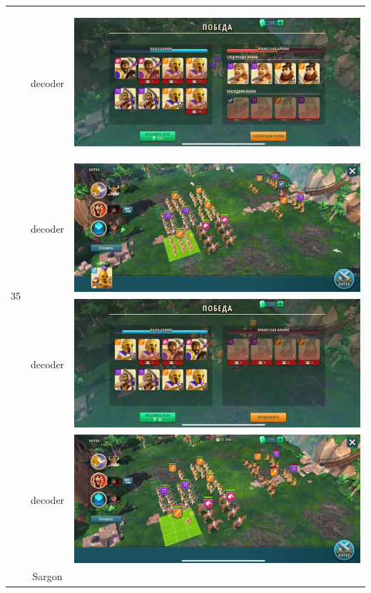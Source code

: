 \begin{longtable}{|c|c|c|}
    \hline
    \multirow{8}{*}{35} & decoder &
    \hypertarget{fight35}{\includegraphics[width=0.75\linewidth]{./parts/media/TreasureHunt/35/decoder/photo_2022-04-07_10-06-08.jpg}} \\
    & decoder &
    \includegraphics[width=0.75\linewidth]{./parts/media/TreasureHunt/35/decoder/photo_2022-04-07_10-05-55.jpg} \\
    & decoder &
    \includegraphics[width=0.75\linewidth]{./parts/media/TreasureHunt/35/decoder/photo_2022-04-07_10-06-14.jpg} \\
    & decoder &
    \includegraphics[width=0.75\linewidth]{./parts/media/TreasureHunt/35/decoder/photo_2022-04-07_10-06-11.jpg} \\
    \hline
    \multirow{8}{*}{35} & Sargon &

\end{longtable}

